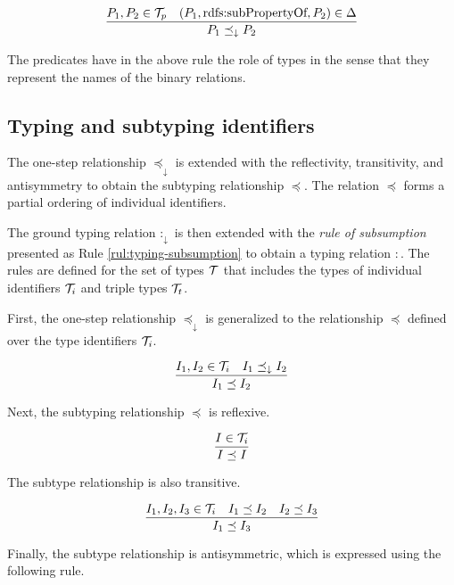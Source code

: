 \documentclass[runningheads]{llncs}
\newcommand{\darr}{\downarrow}
\newcommand{\T}{{\cal T}}
\begin{document}
\begin{equation}
\dfrac{P_1,P_2\in\T_p \quad (P_1,\text{rdfs:subPropertyOf},P_2)\in\D}
      {P_1\preceq_\darr\/P_2}
\end{equation}

The predicates have in the above rule the role of types in the sense
that they represent the names of the binary relations. 



\subsection{Typing and subtyping identifiers\label{sec:idents-typing}}

The one-step relationship $\preceq_\darr$ is extended with the
reflectivity, transitivity, and antisymmetry to obtain the subtyping
relationship $\preceq$. The relation $\preceq$ forms a partial
ordering of individual identifiers.

The ground typing relation $:_\darr$ is then extended with the
\emph{rule of subsumption} presented as Rule
\ref{rul:typing-subsumption} to obtain a typing relation $:$. The
rules are defined for the set of types $\T$ that includes the types of
individual identifiers $\T_i$ and triple types $\T_t$.

First, the one-step relationship $\preceq_\darr$ is generalized to the
relationship $\preceq$ defined over the type identifiers
$\T_i$. 

\begin{equation}
\label{rul:Ic-extended}
\dfrac{I_1,I_2\in\T_i \quad I_1\preceq_\darr\/I_2}
      {I_1 \preceq I_2}
\end{equation}

Next, the subtyping relationship $\preceq$ is reflexive.

\begin{equation}
\label{rul:Ti-reflexivity}
\dfrac{I\in\T_i}
      {I\preceq\/I}
\end{equation}

The subtype relationship is also transitive. 

\begin{equation}
\label{rul:Ti-transitivity}
\dfrac{I_1,I_2,I_3\in\T_i\quad\/I_1\preceq\/I_2\quad\/I_2\preceq\/I_3}
      {I_1\preceq\/I_3}   
\end{equation}

Finally, the subtype relationship is antisymmetric, which is expressed
using the following rule.
\end{document}
